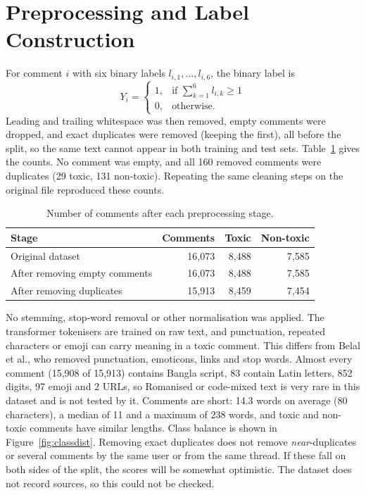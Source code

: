 \section{Preprocessing and Label Construction}

For comment $i$ with six binary labels $l_{i,1},\dots,l_{i,6}$, the binary label is
\begin{equation}
  Y_i = \begin{cases} 1, & \text{if } \sum_{k=1}^{6} l_{i,k} \ge 1 \\ 0, & \text{otherwise.} \end{cases}
\end{equation}
Leading and trailing whitespace was then removed, empty comments were dropped, and exact duplicates were removed (keeping the first), all before the split, so the same text cannot appear in both training and test sets. Table~\ref{tab:prepcounts} gives the counts. No comment was empty, and all 160 removed comments were duplicates (29 toxic, 131 non-toxic). Repeating the same cleaning steps on the original file reproduced these counts.

\begin{table}[H]
  \centering
  \caption{Number of comments after each preprocessing stage.}
  \label{tab:prepcounts}
  \small
  \begin{tabular}{lrrr}
    \toprule
    \textbf{Stage} & \textbf{Comments} & \textbf{Toxic} & \textbf{Non-toxic} \\
    \midrule
    Original dataset              & 16,073 & 8,488 & 7,585 \\
    After removing empty comments & 16,073 & 8,488 & 7,585 \\
    After removing duplicates     & 15,913 & 8,459 & 7,454 \\
    \bottomrule
  \end{tabular}
\end{table}

No stemming, stop-word removal or other normalisation was applied. The transformer tokenisers are trained on raw text, and punctuation, repeated characters or emoji can carry meaning in a toxic comment. This differs from Belal et al., who removed punctuation, emoticons, links and stop words. Almost every comment (15,908 of 15,913) contains Bangla script, 83 contain Latin letters, 852 digits, 97 emoji and 2 URLs, so Romanised or code-mixed text is very rare in this dataset and is not tested by it. Comments are short: 14.3 words on average (80 characters), a median of 11 and a maximum of 238 words, and toxic and non-toxic comments have similar lengths. Class balance is shown in Figure~\ref{fig:classdist}. Removing exact duplicates does not remove \emph{near}-duplicates or several comments by the same user or from the same thread. If these fall on both sides of the split, the scores will be somewhat optimistic. The dataset does not record sources, so this could not be checked.

